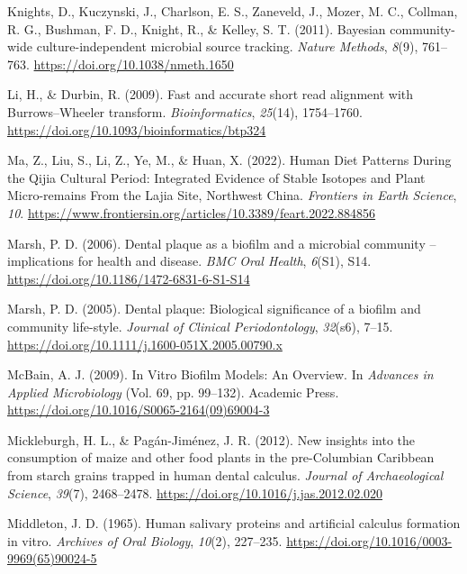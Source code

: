 \documentclass[
]{article}
\newlength{\cslhangindent}
\newlength{\cslentryspacingunit} %
\newenvironment{CSLReferences}[2] %
 {%
  \setlength{\parindent}{0pt}
  \ifodd #1
  \let\oldpar\par
  \def\par{\hangindent=\cslhangindent\oldpar}
  \fi
  \setlength{\parskip}{#2\cslentryspacingunit}
 }%
 {}
\begin{document}
\begin{CSLReferences}{1}{0}
\leavevmode{}%
Knights, D., Kuczynski, J., Charlson, E. S., Zaneveld, J., Mozer, M. C.,
Collman, R. G., Bushman, F. D., Knight, R., \& Kelley, S. T. (2011).
Bayesian community-wide culture-independent microbial source tracking.
\emph{Nature Methods}, \emph{8}(9), 761--763.
\url{https://doi.org/10.1038/nmeth.1650}

\leavevmode{}%
Li, H., \& Durbin, R. (2009). Fast and accurate short read alignment
with {Burrows}--{Wheeler} transform. \emph{Bioinformatics},
\emph{25}(14), 1754--1760.
\url{https://doi.org/10.1093/bioinformatics/btp324}

\leavevmode{}%
Ma, Z., Liu, S., Li, Z., Ye, M., \& Huan, X. (2022). Human {Diet
Patterns During} the {Qijia Cultural Period}: {Integrated Evidence} of
{Stable Isotopes} and {Plant Micro-remains From} the {Lajia Site},
{Northwest China}. \emph{Frontiers in Earth Science}, \emph{10}.
\url{https://www.frontiersin.org/articles/10.3389/feart.2022.884856}

\leavevmode{}%
Marsh, P. D. (2006). Dental plaque as a biofilm and a microbial
community -- implications for health and disease. \emph{BMC Oral
Health}, \emph{6}(S1), S14.
\url{https://doi.org/10.1186/1472-6831-6-S1-S14}

\leavevmode{}%
Marsh, P. D. (2005). Dental plaque: Biological significance of a biofilm
and community life-style. \emph{Journal of Clinical Periodontology},
\emph{32}(s6), 7--15.
\url{https://doi.org/10.1111/j.1600-051X.2005.00790.x}

\leavevmode{}%
McBain, A. J. (2009). In {Vitro Biofilm Models}: {An Overview}. In
\emph{Advances in {Applied Microbiology}} (Vol. 69, pp. 99--132).
{Academic Press}. \url{https://doi.org/10.1016/S0065-2164(09)69004-3}

\leavevmode{}%
Mickleburgh, H. L., \& Pagán-Jiménez, J. R. (2012). New insights into
the consumption of maize and other food plants in the pre-{Columbian
Caribbean} from starch grains trapped in human dental calculus.
\emph{Journal of Archaeological Science}, \emph{39}(7), 2468--2478.
\url{https://doi.org/10.1016/j.jas.2012.02.020}

\leavevmode{}%
Middleton, J. D. (1965). Human salivary proteins and artificial calculus
formation in vitro. \emph{Archives of Oral Biology}, \emph{10}(2),
227--235. \url{https://doi.org/10.1016/0003-9969(65)90024-5}


\end{CSLReferences}
\end{document}

